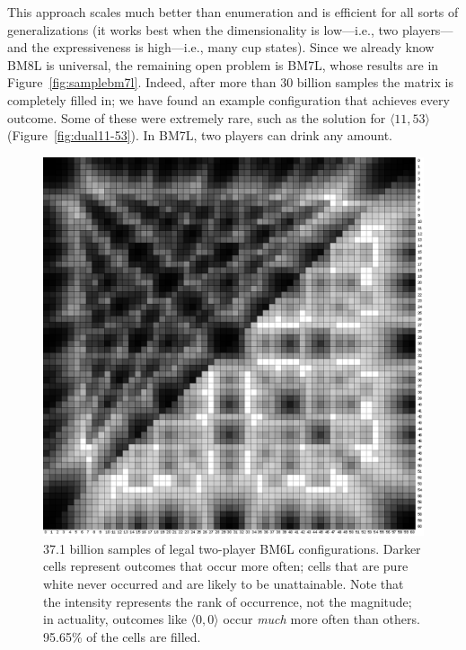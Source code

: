 \documentclass[twocolumn]{article}
\begin{document}
This approach scales much better than enumeration and is efficient for
all sorts of generalizations (it works best when the dimensionality is
low---i.e., two players---and the expressiveness is high---i.e., many
cup states). Since we already know BM8L is universal, the remaining
open problem is BM7L, whose results are in
Figure~\ref{fig:samplebm7l}. Indeed, after more than 30 billion
samples the matrix is completely filled in; we have found an example
configuration that achieves every outcome. Some of these were
extremely rare, such as the solution for $\langle 11, 53 \rangle$
(Figure~\ref{fig:dual11-53}). In BM7L, two players can drink any
amount.

\begin{figure}
\begin{center}
\includegraphics[width=0.90 \linewidth]{sample60min2players6states.png}
\end{center}\vspace{-0.1in}
\caption{ 37.1 billion samples of legal two-player BM6L
  configurations. Darker cells represent outcomes that occur more
  often; cells that are pure white never occurred and are likely to be
  unattainable. Note that the intensity represents the rank of
  occurrence, not the magnitude; in actuality, outcomes like $\langle
  0, 0 \rangle$ occur {\em much} more often than others.
  95.65\% of the cells are filled.
}
\label{fig:samplebm6l}
\end{figure}
\end{document}
